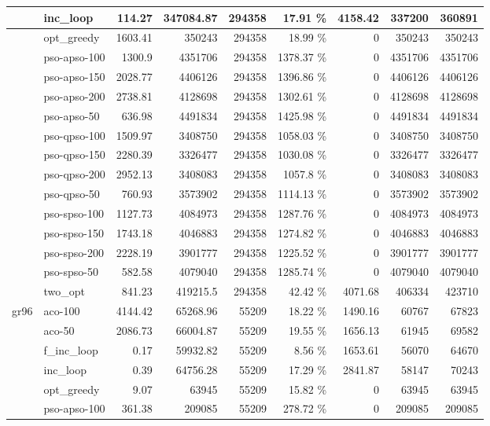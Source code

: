 \documentclass[conference]{IEEEtran}
\begin{document}
\begin{center}
\begin{longtable}[ht]{|l|l|r|r|r|r|r|r|r|}
 & inc\_loop & 114.27 & 347084.87 & 294358 & 17.91 \% & 4158.42 & 337200 & 360891 \\ \hline
 & opt\_greedy & 1603.41 & 350243 & 294358 & 18.99 \% & 0 & 350243 & 350243 \\ \hline
 & pso-apso-100 & 1300.9 & 4351706 & 294358 & 1378.37 \% & 0 & 4351706 & 4351706 \\ \hline
 & pso-apso-150 & 2028.77 & 4406126 & 294358 & 1396.86 \% & 0 & 4406126 & 4406126 \\ \hline
 & pso-apso-200 & 2738.81 & 4128698 & 294358 & 1302.61 \% & 0 & 4128698 & 4128698 \\ \hline
 & pso-apso-50 & 636.98 & 4491834 & 294358 & 1425.98 \% & 0 & 4491834 & 4491834 \\ \hline
 & pso-qpso-100 & 1509.97 & 3408750 & 294358 & 1058.03 \% & 0 & 3408750 & 3408750 \\ \hline
 & pso-qpso-150 & 2280.39 & 3326477 & 294358 & 1030.08 \% & 0 & 3326477 & 3326477 \\ \hline
 & pso-qpso-200 & 2952.13 & 3408083 & 294358 & 1057.8 \% & 0 & 3408083 & 3408083 \\ \hline
 & pso-qpso-50 & 760.93 & 3573902 & 294358 & 1114.13 \% & 0 & 3573902 & 3573902 \\ \hline
 & pso-spso-100 & 1127.73 & 4084973 & 294358 & 1287.76 \% & 0 & 4084973 & 4084973 \\ \hline
 & pso-spso-150 & 1743.18 & 4046883 & 294358 & 1274.82 \% & 0 & 4046883 & 4046883 \\ \hline
 & pso-spso-200 & 2228.19 & 3901777 & 294358 & 1225.52 \% & 0 & 3901777 & 3901777 \\ \hline
 & pso-spso-50 & 582.58 & 4079040 & 294358 & 1285.74 \% & 0 & 4079040 & 4079040 \\ \hline
 & two\_opt & 841.23 & 419215.5 & 294358 & 42.42 \% & 4071.68 & 406334 & 423710 \\ \hline
gr96 & aco-100 & 4144.42 & 65268.96 & 55209 & 18.22 \% & 1490.16 & 60767 & 67823 \\ \hline
 & aco-50 & 2086.73 & 66004.87 & 55209 & 19.55 \% & 1656.13 & 61945 & 69582 \\ \hline
 & f\_inc\_loop & 0.17 & 59932.82 & 55209 & 8.56 \% & 1653.61 & 56070 & 64670 \\ \hline
 & inc\_loop & 0.39 & 64756.28 & 55209 & 17.29 \% & 2841.87 & 58147 & 70243 \\ \hline
 & opt\_greedy & 9.07 & 63945 & 55209 & 15.82 \% & 0 & 63945 & 63945 \\ \hline
 & pso-apso-100 & 361.38 & 209085 & 55209 & 278.72 \% & 0 & 209085 & 209085 \\ \hline

\end{longtable}
\end{center}
\end{document}
